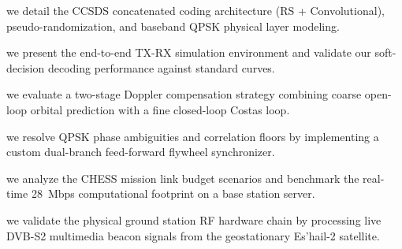  \label{ch:Quick Summary}

\vspace{2ex} %

 we detail the CCSDS concatenated coding architecture (RS + Convolutional), pseudo-randomization, and baseband QPSK physical layer modeling.

 we present the end-to-end TX-RX simulation environment and validate our soft-decision decoding performance against standard curves.

 we evaluate a two-stage Doppler compensation strategy combining coarse open-loop orbital prediction with a fine closed-loop Costas loop.

 we resolve QPSK phase ambiguities and correlation floors by implementing a custom dual-branch feed-forward flywheel synchronizer.

 we analyze the CHESS mission link budget scenarios and benchmark the real-time 28~Mbps computational footprint on a base station server.

 we validate the physical ground station RF hardware chain by processing live DVB-S2 multimedia beacon signals from the geostationary Es'hail-2 satellite.

